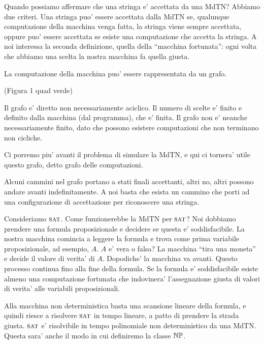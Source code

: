Quando possiamo affermare che una stringa e' accettata da una MdTN? Abbiamo due criteri. Una stringa
puo' essere accettata dalla MdTN se, qualunque computazione della macchina venga fatta, la stringa
viene sempre accettata, oppure puo' essere accettata se esiste una computazione che accetta la
stringa. A noi interessa la seconda definizione, quella della ``macchina fortunata'': ogni volta che
abbiamo una scelta la nostra macchina fa quella giusta.


La computazione della macchina puo' essere rappresentata da un grafo.

(Figura 1 quad verde)

Il grafo e' diretto non necessariamente aciclico. Il numero di scelte e' finito e definito dalla
macchina (dal programma), che e' finita. Il grafo non e' neanche necessariamente finito, dato che
possono esistere computazioni che non terminano non cicliche.

Ci porremo piu' avanti il problema di simulare la MdTN, e qui ci tornera' utile questo grafo, detto
grafo delle computazioni.

Alcuni cammini nel grafo portano a stati finali accettanti, altri no, altri possono andare avanti
indefinitamente. A noi basta che esista un cammino che porti ad una configurazione di accettazione
per riconoscere una stringa. 


Consideriamo $\textsc{sat}$. Come funzionerebbe la MdTN per $\textsc{sat}$? Noi dobbiamo prendere una formula
proposizionale e decidere se questa e' soddisfacibile. La nostra macchina comincia a leggere la
formula e trova come prima variabile proposizionale, ad esempio, $A$. $A$ e' vera o falsa? La
macchina ``tira una moneta'' e decide il valore di verita' di $A$. Dopodiche' la macchina va avanti.
Questo processo continua fino alla fine della formula. Se la formula e' soddisfacibile esiste almeno
una computazione fortunata che indovinera' l'assegnazione giusta di valori di verita' alle variabili
proposizionali.

Alla macchina non deterministica basta una scansione lineare della formula, e quindi riesce a
risolvere $\textsc{sat}$ in tempo lineare, a patto di prendere la strada giusta. $\textsc{sat}$ e' risolvibile in
tempo polinomiale non deterministico da una MdTN. Questa sara' anche il modo in cui definiremo la
classe $\mathbb{NP}$.

